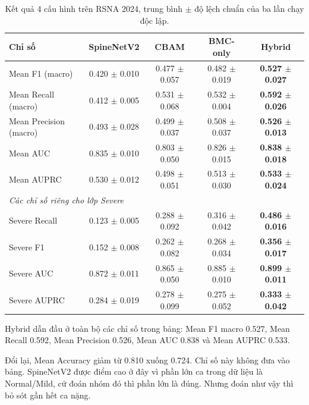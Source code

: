 \begin{table}[htbp]
\centering
\caption{Kết quả 4 cấu hình trên RSNA 2024, trung bình $\pm$ độ lệch chuẩn của ba lần chạy độc lập.}
\label{tab:rsna_ablation}
\renewcommand{\arraystretch}{1.2}
\setlength{\tabcolsep}{4pt}
\begin{tabular}{lcccc}
\toprule
\textbf{Chỉ số} & \textbf{SpineNetV2} & \textbf{CBAM} & \textbf{BMC-only} & \textbf{Hybrid} \\
\midrule
Mean F1 (macro)        & 0.420 $\pm$ 0.010 & 0.477 $\pm$ 0.057 & 0.482 $\pm$ 0.019 & \textbf{0.527 $\pm$ 0.027} \\
Mean Recall (macro)    & 0.412 $\pm$ 0.005 & 0.531 $\pm$ 0.068 & 0.532 $\pm$ 0.004 & \textbf{0.592 $\pm$ 0.026} \\
Mean Precision (macro) & 0.493 $\pm$ 0.028 & 0.499 $\pm$ 0.037 & 0.508 $\pm$ 0.037 & \textbf{0.526 $\pm$ 0.013} \\
Mean AUC               & 0.835 $\pm$ 0.010 & 0.803 $\pm$ 0.050 & 0.826 $\pm$ 0.015 & \textbf{0.838 $\pm$ 0.018} \\
Mean AUPRC             & 0.530 $\pm$ 0.012 & 0.498 $\pm$ 0.051 & 0.513 $\pm$ 0.030 & \textbf{0.533 $\pm$ 0.024} \\
\midrule
\multicolumn{5}{l}{\textit{Các chỉ số riêng cho lớp Severe}} \\
\midrule
Severe Recall          & 0.123 $\pm$ 0.005 & 0.288 $\pm$ 0.092 & 0.316 $\pm$ 0.042 & \textbf{0.486 $\pm$ 0.016} \\
Severe F1              & 0.152 $\pm$ 0.008 & 0.262 $\pm$ 0.082 & 0.268 $\pm$ 0.034 & \textbf{0.356 $\pm$ 0.017} \\
Severe AUC             & 0.872 $\pm$ 0.011 & 0.865 $\pm$ 0.050 & 0.885 $\pm$ 0.010 & \textbf{0.899 $\pm$ 0.011} \\
Severe AUPRC           & 0.284 $\pm$ 0.019 & 0.278 $\pm$ 0.099 & 0.275 $\pm$ 0.052 & \textbf{0.333 $\pm$ 0.042} \\
\bottomrule
\end{tabular}
\end{table}

Hybrid dẫn đầu ở toàn bộ các chỉ số trong bảng: Mean F1 macro 0.527, Mean Recall 0.592, Mean Precision 0.526, Mean AUC 0.838 và Mean AUPRC 0.533.

Đổi lại, Mean Accuracy giảm từ 0.810 xuống 0.724. Chỉ số này không đưa vào bảng. SpineNetV2 được điểm cao ở đây vì phần lớn ca trong dữ liệu là Normal/Mild, cứ đoán nhóm đó thì phần lớn là đúng. Nhưng đoán như vậy thì bỏ sót gần hết ca nặng.

